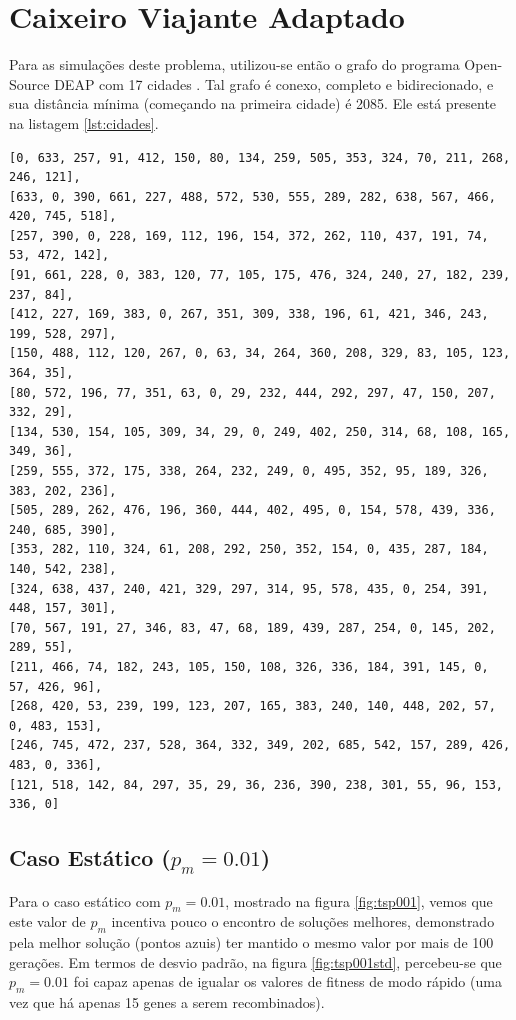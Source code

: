 \section{Caixeiro Viajante Adaptado}

Para as simulações deste problema, utilizou-se então o grafo do programa Open-Source DEAP com 17 cidades \cite{DEAP_JMLR2012, deap2016tsp}. Tal grafo é conexo, completo e bidirecionado, e sua distância mínima (começando na primeira cidade) é 2085. Ele está presente na listagem \ref{lst:cidades}.

\begin{lstlisting}[float, floatplacement=H, caption={Mapa de cidades para o problema do Caixeiro Viajante Adaptado.}, label=lst:cidades]
[0, 633, 257, 91, 412, 150, 80, 134, 259, 505, 353, 324, 70, 211, 268, 246, 121],
[633, 0, 390, 661, 227, 488, 572, 530, 555, 289, 282, 638, 567, 466, 420, 745, 518],
[257, 390, 0, 228, 169, 112, 196, 154, 372, 262, 110, 437, 191, 74, 53, 472, 142],
[91, 661, 228, 0, 383, 120, 77, 105, 175, 476, 324, 240, 27, 182, 239, 237, 84],
[412, 227, 169, 383, 0, 267, 351, 309, 338, 196, 61, 421, 346, 243, 199, 528, 297],
[150, 488, 112, 120, 267, 0, 63, 34, 264, 360, 208, 329, 83, 105, 123, 364, 35],
[80, 572, 196, 77, 351, 63, 0, 29, 232, 444, 292, 297, 47, 150, 207, 332, 29],
[134, 530, 154, 105, 309, 34, 29, 0, 249, 402, 250, 314, 68, 108, 165, 349, 36],
[259, 555, 372, 175, 338, 264, 232, 249, 0, 495, 352, 95, 189, 326, 383, 202, 236],
[505, 289, 262, 476, 196, 360, 444, 402, 495, 0, 154, 578, 439, 336, 240, 685, 390],
[353, 282, 110, 324, 61, 208, 292, 250, 352, 154, 0, 435, 287, 184, 140, 542, 238],
[324, 638, 437, 240, 421, 329, 297, 314, 95, 578, 435, 0, 254, 391, 448, 157, 301],
[70, 567, 191, 27, 346, 83, 47, 68, 189, 439, 287, 254, 0, 145, 202, 289, 55],
[211, 466, 74, 182, 243, 105, 150, 108, 326, 336, 184, 391, 145, 0, 57, 426, 96],
[268, 420, 53, 239, 199, 123, 207, 165, 383, 240, 140, 448, 202, 57, 0, 483, 153],
[246, 745, 472, 237, 528, 364, 332, 349, 202, 685, 542, 157, 289, 426, 483, 0, 336],
[121, 518, 142, 84, 297, 35, 29, 36, 236, 390, 238, 301, 55, 96, 153, 336, 0]
\end{lstlisting}

\subsection{Caso Estático ($p_m = 0.01$)}

Para o caso estático com $p_m = 0.01$, mostrado na figura \ref{fig:tsp001}, vemos que este valor de $p_m$ incentiva pouco o encontro de soluções melhores, demonstrado pela melhor solução (pontos azuis) ter mantido o mesmo valor por mais de 100 gerações. Em termos de desvio padrão, na figura \ref{fig:tsp001std}, percebeu-se que $p_m = 0.01$ foi capaz apenas de igualar os valores de fitness de modo rápido (uma vez que há apenas 15 genes a serem recombinados).

